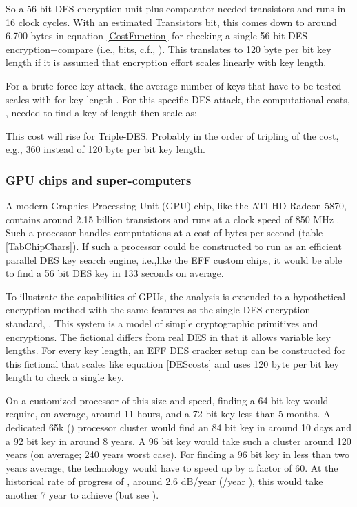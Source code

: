 \documentclass{article}
\begin{document}
So a 56-bit DES encryption unit plus comparator needed  transistors and 
runs in 16 clock cycles. With an estimated Transistors  bit, this 
comes down to around 6,700 bytes in equation \ref{CostFunction} for checking a 
single 56-bit DES encryption+compare
(i.e.,  bits, c.f., \cite{Son0911-5262}). This translates to 
120 byte per bit key length if it is assumed that encryption effort scales linearly 
with key length.

For a brute force key attack, the average number of keys that have to be tested scales 
with  for key length . For this specific DES attack, the computational costs, 
, needed to find a key of length  then scale as:
 
This cost will rise for Triple-DES. Probably in the order of tripling of the cost, e.g., 360 instead
of 120 byte per bit key length.

\subsubsection{GPU chips and super-computers}\label{SectGPU}

A modern Graphics Processing Unit (GPU) chip, like the ATI HD Radeon 5870, contains 
around 2.15 billion
transistors and runs at a clock speed of 850 MHz \cite{LoydCase2009}. 
Such a processor handles computations at a cost of  
bytes per second (table \ref{TabChipChars}).
If such a processor could be constructed to run as an efficient parallel DES key search engine, 
i.e.,like the EFF custom chips, it would be able to find a 56 bit DES key in 133 seconds 
on average.

To illustrate the capabilities of GPUs, the analysis is extended to a hypothetical encryption
method with the same features as the single DES encryption standard, .
This  system is a model of simple cryptographic primitives and encryptions.
The fictional  differs from real DES in that it allows variable key lengths.
For every key length, an EFF DES cracker setup can be constructed for this fictional 
 that scales like equation \ref{DEScosts} and uses 120 byte per bit key length 
to check a single key.

On a customized processor of this size and speed, finding a 64 bit  key would 
require, on average, around 11 hours, and a 72 bit   key less than 5 months. A 
dedicated 65k () processor cluster would find an 84 bit   key in 
around 10 days and a 92 bit key in around 8 years. A 96 bit   key would take 
such a cluster around 120 years (on average; 240 years worst case). For 
finding a 96 bit   key in less than two years average, the technology would 
have to speed up by a factor of 60. At the historical rate of progress of , 
around 2.6 dB/year (/year \cite{Son0911-5262}), this would take another 
7 year to achieve (but see \cite{tuomi2002lives}).
\end{document}
